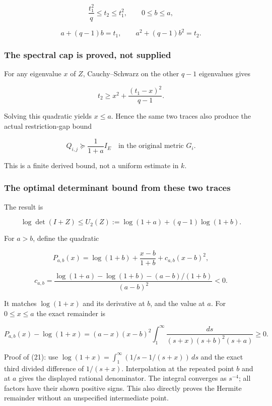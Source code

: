 \documentclass[
  11pt,
]{article}
\begin{document}
\[
 \frac{t_1^2}{q}\le t_2\le t_1^2,
 \qquad 0\le b\le a,
\]

\[
 a+(q-1)b=t_1,\qquad a^2+(q-1)b^2=t_2.                         \tag{17}
\]

\subsubsection{The spectral cap is proved, not
supplied}\label{the-spectral-cap-is-proved-not-supplied}

For any eigenvalue \(x\) of \(Z\), Cauchy--Schwarz on the other \(q-1\)
eigenvalues gives

\[
 t_2\ge x^2+\frac{(t_1-x)^2}{q-1}.
\]

Solving this quadratic yields \(x\le a\). Hence the same two traces also
produce the actual restriction-gap bound

\[
 \boxed{Q_{i,j}\succeq\frac1{1+a}I_E
 \quad\text{in the original metric }G_i.}                      \tag{18}
\]

This is a finite derived bound, not a uniform estimate in \(k\).

\subsubsection{The optimal determinant bound from these two
traces}\label{the-optimal-determinant-bound-from-these-two-traces}

The result is

\[
 \boxed{
 \log\det(I+Z)\le U_2(Z):=\log(1+a)+(q-1)\log(1+b).
 }                                                             \tag{19}
\]

For \(a>b\), define the quadratic

\[
 P_{a,b}(x)=\log(1+b)+\frac{x-b}{1+b}+c_{a,b}(x-b)^2,
\]

\[
 c_{a,b}=
 \frac{\log(1+a)-\log(1+b)-(a-b)/(1+b)}{(a-b)^2}<0.              \tag{20}
\]

It matches \(\log(1+x)\) and its derivative at \(b\), and the value at
\(a\). For \(0\le x\le a\) the exact remainder is

\[
 \boxed{
 P_{a,b}(x)-\log(1+x)
 =(a-x)(x-b)^2
 \int_1^\infty\frac{ds}{(s+x)(s+b)^2(s+a)}\ge0.
 }                                                             \tag{21}
\]

Proof of (21): use \(\log(1+x)=\int_1^\infty(1/s-1/(s+x))\,ds\) and the
exact third divided difference of \(1/(s+x)\). Interpolation at the
repeated point \(b\) and at \(a\) gives the displayed rational
denominator. The integral converges as \(s^{-4}\); all factors have
their shown positive signs. This also directly proves the Hermite
remainder without an unspecified intermediate point.
\end{document}
